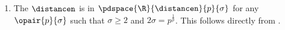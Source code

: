 \begin{example}
\begin{enumerate}
  \item The  $\distancen$ is  in 
        $\pdspace{\R}{\distancen}{p}{\sigma}$
        for any $\opair{p}{\sigma}$ such that $\sigma\ge2$ and $2\sigma=p^\frac{1}{p}$.
        This follows directly from .
\end{enumerate}
\end{example}





